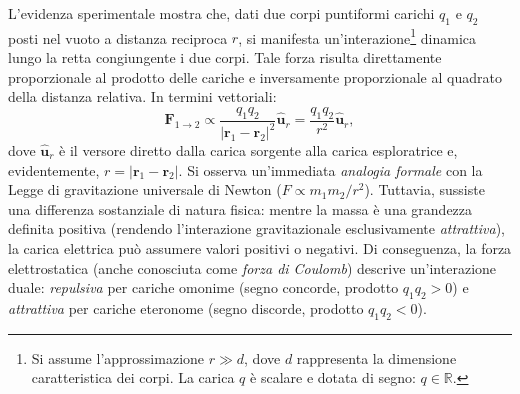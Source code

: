 \documentclass[a4paper,11pt]{report}
\begin{document}
L'evidenza sperimentale mostra che, dati due corpi puntiformi carichi $q_1$ e $q_2$ posti nel vuoto a distanza reciproca $r$, si manifesta un'interazione\footnote{Si assume l'approssimazione $r \gg d$, dove $d$ rappresenta la dimensione caratteristica dei corpi. La carica $q$ è scalare e dotata di segno: $q \in \mathbb{R}$.} dinamica lungo la retta congiungente i due corpi.
Tale forza risulta direttamente proporzionale al prodotto delle cariche e inversamente proporzionale al quadrato della distanza relativa. In termini vettoriali:
\begin{equation}
    \bm{F}_{1 \to 2} \propto \frac{q_1 q_2}{|\bm{r}_1-\bm{r}_2|^2} \hat{\bm{u}}_r = \frac{q_1 q_2}{r^2} \hat{\bm{u}}_r,
    \label{eq:proporzionalita_coulomb}
\end{equation}
dove $\hat{\bm{u}}_r$ è il versore diretto dalla carica sorgente alla carica esploratrice e, evidentemente, $r = |\bm{r}_1-\bm{r}_2|$.
Si osserva un'immediata \textit{analogia formale} con la Legge di gravitazione universale di Newton ($F \propto m_1 m_2 / r^2$). Tuttavia, sussiste una differenza sostanziale di natura fisica: mentre la massa è una grandezza definita positiva (rendendo l'interazione gravitazionale esclusivamente \textit{attrattiva}), la carica elettrica può assumere valori positivi o negativi. Di conseguenza, la forza elettrostatica (anche conosciuta come \textit{forza di Coulomb}) descrive un'interazione duale: \textit{repulsiva} per cariche omonime (segno concorde, prodotto $q_1q_2 > 0$) e \textit{attrattiva} per cariche eteronome (segno discorde, prodotto $q_1q_2 < 0$).
\end{document}
